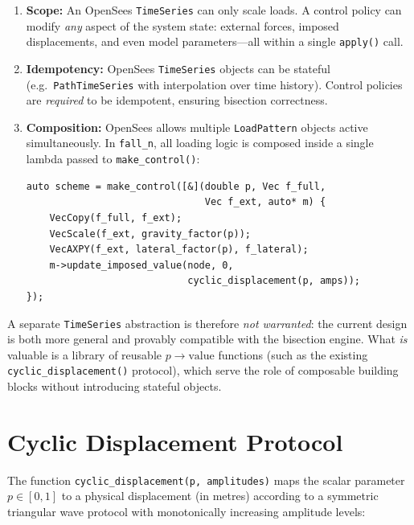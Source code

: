 \begin{enumerate}
  \item \textbf{Scope:} An OpenSees \texttt{TimeSeries} can only scale
    loads.  A control policy can modify \emph{any} aspect of the system
    state: external forces, imposed displacements, and even model
    parameters---all within a single \texttt{apply()} call.
  \item \textbf{Idempotency:} OpenSees \texttt{TimeSeries} objects
    can be stateful (e.g.\ \texttt{PathTimeSeries} with interpolation
    over time history).  Control policies are \emph{required} to be
    idempotent, ensuring bisection correctness.
  \item \textbf{Composition:} OpenSees allows multiple
    \texttt{LoadPattern} objects active simultaneously.
    In \texttt{fall\_n}, all loading logic is composed inside a single
    lambda passed to \texttt{make\_control()}:
    \begin{lstlisting}
auto scheme = make_control([&](double p, Vec f_full,
                               Vec f_ext, auto* m) {
    VecCopy(f_full, f_ext);
    VecScale(f_ext, gravity_factor(p));
    VecAXPY(f_ext, lateral_factor(p), f_lateral);
    m->update_imposed_value(node, 0,
                            cyclic_displacement(p, amps));
});
    \end{lstlisting}
\end{enumerate}

A separate \texttt{TimeSeries} abstraction is therefore \emph{not
warranted}: the current design is both more general and provably
compatible with the bisection engine.  What \emph{is} valuable is a
library of reusable $p \to \text{value}$ functions (such as the existing
\texttt{cyclic\_displacement()} protocol), which serve the role of
composable building blocks without introducing stateful objects.


\section{Cyclic Displacement Protocol}
\label{sec:cyclic-protocol}

The function \texttt{cyclic\_displacement(p, amplitudes)} maps the
scalar parameter~$p \in [0,1]$ to a physical displacement (in metres)
according to a symmetric triangular wave protocol with monotonically
increasing amplitude levels:

